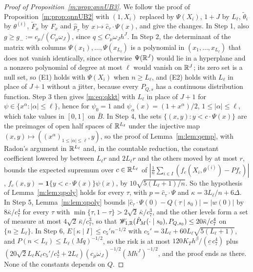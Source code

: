 \begin{proof}[Proof of Proposition~\ref{m:prop:qnnUB3}]
We follow the proof of Proposition~\ref{m:prop:qnnUB2} with $(1,X_i)$ replaced by $\Psi(X_i)$, $1+J$ by $L_\ell$, $\tilde\theta_i$ by $\theta^{(i)}$, $\tilde F_x$ by $F_x$ and $\hat p_\tau$ by $x\mapsto\hat c_\tau\cdot\Psi(x)$, and give the changes. In Step 1, also $g\ge g_-:=c_\mu/(C_\mu\omega_J)$, since $q\le C_\mu\omega_Jh^J$. In Step 2, the determinant of the matrix with columns $\Psi(x_1),\dots,\Psi(x_{L_\ell})$ is a polynomial in $(x_1,\dots,x_{L_\ell})$ that does not vanish identically, since otherwise $\Psi(\mathbb{R}^J)$ would lie in a hyperplane and a nonzero polynomial of degree at most $\ell$ would vanish on $\mathbb{R}^J$; its zero set is a null set, so (E1) holds with $\Psi(X_i)$ when $n\ge L_\ell$, and (E2) holds with $L_\ell$ in place of $J+1$ without a jitter, because every $P_{Q,s}$ has a continuous distribution function. Step 3 then gives \eqref{m:eq:qkkt} with $L_\ell$ in place of $J+1$ for $\psi\in\{x^\alpha:|\alpha|\le\ell\}$, hence for $\psi_0=1$ and $\psi_\alpha(x)=(1+x^\alpha)/2$, $1\le|\alpha|\le\ell$, which take values in $[0,1]$ on $\bar B$. In Step 4, the sets $\{(x,y):y<c\cdot\Psi(x)\}$ are the preimages of open half spaces of $\mathbb{R}^{L_\ell}$ under the injective map $(x,y)\mapsto((x^\alpha)_{1\le|\alpha|\le\ell},y)$, so the proof of Lemma~\ref{m:lem:qemp}, with Radon's argument in $\mathbb{R}^{L_\ell}$ and, in the countable reduction, the constant coefficient lowered by between $L_\ell r$ and $2L_\ell r$ and the others moved by at most $r$, bounds the expected supremum over $c\in\mathbb{R}^{L_\ell}$ of $|\frac1n\sum_{i\in I}(f_c(X_i,\theta^{(i)})-Pf_c)|$, $f_c(x,y)=\mathbf 1\{y<c\cdot\Psi(x)\}\psi(x)$, by $10\sqrt{5(L_\ell+1)/n}$. So the hypothesis of Lemma~\ref{m:lem:qpoly} holds for every $\tau$, with $p=\hat c_\tau\cdot\Psi$ and $\kappa=3L_\ell/n+6\Delta$. In Step 5, Lemma~\ref{m:lem:qpoly} bounds $|\hat c_\tau\cdot\Psi(0)-Q(\tau\mid s_0)|=|w(0)|$ by $8\bar\kappa/c_7^4$ for every $\tau$ with $\min\{\tau,1-\tau\}>2\sqrt2\,\bar\kappa/c_7^3$, and the other levels form a set of measure at most $4\sqrt2\,\bar\kappa/c_7^3$, so that $\mathscr{W}_{1,\mathbb{R}}(\hat P_M(\cdot\mid s_0),P_{Q,s_0})\le20\bar\kappa/c_7^4$ on $\{n\ge L_\ell\}$. In Step 6, $E[\kappa\mid I]\le c_5'n^{-1/2}$ with $c_5'=3L_\ell+60L_\ell\sqrt{5(L_\ell+1)}$, and $P(n<L_\ell)\le L_\ell(Mq)^{-1/2}$, so the risk is at most $120K_Th^\beta/(\underline c\,c_7^4)$ plus $(20\sqrt2L_\ell K_\ell c_5'/c_7^4+2L_\ell)(c_\mu\omega_J)^{-1/2}(Mh^J)^{-1/2}$, and the proof ends as there. None of the constants depends on $Q$.
\end{proof}

